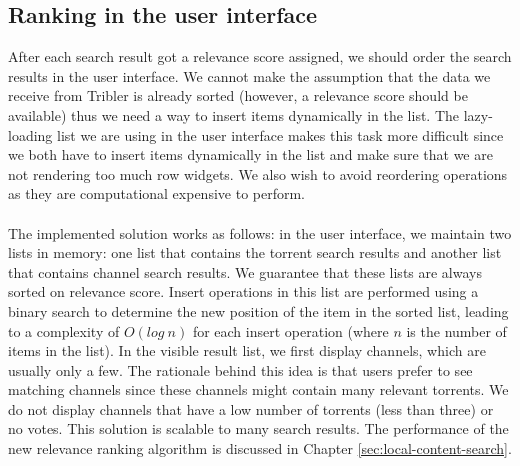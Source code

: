 \subsection{Ranking in the user interface}
After each search result got a relevance score assigned, we should order the search results in the user interface. We cannot make the assumption that the data we receive from Tribler is already sorted (however, a relevance score should be available) thus we need a way to insert items dynamically in the list. The lazy-loading list we are using in the user interface makes this task more difficult since we both have to insert items dynamically in the list and make sure that we are not rendering too much row widgets. We also wish to avoid reordering operations as they are computational expensive to perform.\\\\
The implemented solution works as follows: in the user interface, we maintain two lists in memory: one list that contains the torrent search results and another list that contains channel search results. We guarantee that these lists are always sorted on relevance score. Insert operations in this list are performed using a binary search to determine the new position of the item in the sorted list, leading to a complexity of $ O(log\ n) $ for each insert operation (where $ n $ is the number of items in the list). In the visible result list, we first display channels, which are usually only a few. The rationale behind this idea is that users prefer to see matching channels since these channels might contain many relevant torrents. We do not display channels that have a low number of torrents (less than three) or no votes. This solution is scalable to many search results. The performance of the new relevance ranking algorithm is discussed in Chapter \ref{sec:local-content-search}.


